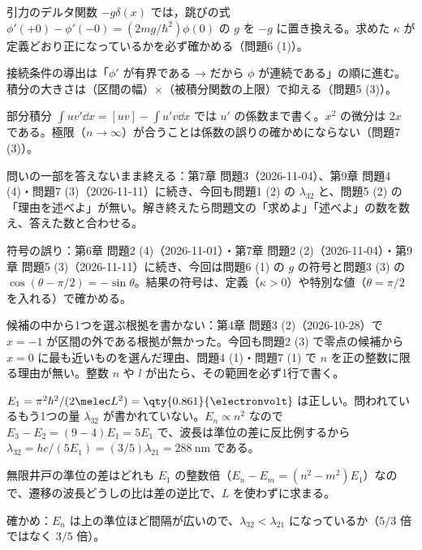 \begin{daiji}
  \item 引力のデルタ関数 $-g\delta(x)$ では，跳びの式 $\phi'(+0)-\phi'(-0)=(2mg/\hbar^{2})\phi(0)$ の $g$ を $-g$ に置き換える。求めた $\kappa$ が定義どおり正になっているかを必ず確かめる（問題6 (1)）。
  \item 接続条件の導出は「$\phi'$ が有界である → だから $\phi$ が連続である」の順に進む。積分の大きさは（区間の幅）$\times$（被積分関数の上限）で抑える（問題5 (3)）。
  \item 部分積分 $\int uv'\dd x=[uv]-\int u'v\dd x$ では $u'$ の係数まで書く。$x^{2}$ の微分は $2x$ である。極限（$n\to\infty$）が合うことは係数の誤りの確かめにならない（問題7 (3)）。
\end{daiji}
\begin{maemo}
  \item 問いの一部を答えないまま終える：第7章 問題3（2026-11-04）、第9章 問題4 (4)・問題7 (3)（2026-11-11）に続き、今回も問題1 (2) の $\lambda_{32}$ と、問題5 (2) の「理由を述べよ」が無い。解き終えたら問題文の「求めよ」「述べよ」の数を数え、答えた数と合わせる。
  \item 符号の誤り：第6章 問題2 (4)（2026-11-01）・第7章 問題2 (2)（2026-11-04）・第9章 問題5 (3)（2026-11-11）に続き、今回は問題6 (1) の $g$ の符号と問題3 (3) の $\cos(\theta-\pi/2)=-\sin\theta$。結果の符号は、定義（$\kappa>0$）や特別な値（$\theta=\pi/2$ を入れる）で確かめる。
  \item 候補の中から1つを選ぶ根拠を書かない：第4章 問題3 (2)（2026-10-28）で $x=-1$ が区間の外である根拠が無かった。今回も問題2 (3) で零点の候補から $x=0$ に最も近いものを選んだ理由、問題4 (1)・問題7 (1) で $n$ を正の整数に限る理由が無い。整数 $n$ や $l$ が出たら、その範囲を必ず1行で書く。
\end{maemo}
\begin{kotaeran}
   $E_{1}=\pi^{2}\hbar^{2}/(2\melec L^{2})=\qty{0.861}{\electronvolt}$ は正しい。問われているもう1つの量 $\lambda_{32}$ が書かれていない。$E_{n}\propto n^{2}$ なので $E_{3}-E_{2}=(9-4)E_{1}=5E_{1}$ で、波長は準位の差に反比例するから $\lambda_{32}=hc/(5E_{1})=(3/5)\lambda_{21}=\qty{288}{\nano\metre}$ である。
\end{kotaeran}
\begin{rikai}
  \item 無限井戸の準位の差はどれも $E_{1}$ の整数倍（$E_{n}-E_{m}=(n^{2}-m^{2})E_{1}$）なので、遷移の波長どうしの比は差の逆比で、$L$ を使わずに求まる。
  \item 確かめ：$E_{n}$ は上の準位ほど間隔が広いので、$\lambda_{32}<\lambda_{21}$ になっているか（$5/3$ 倍ではなく $3/5$ 倍）。
\end{rikai}
